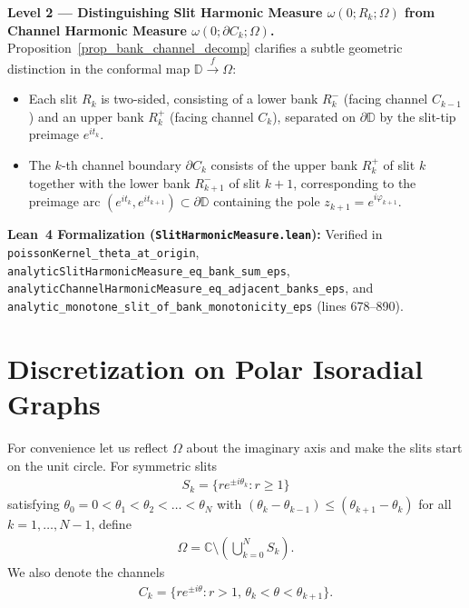 \documentclass[11pt,reqno]{amsart}
\numberwithin{equation}{section}
\renewcommand{\phi}{\varphi}
\newcommand{\D}{\mathbb{D}}
\newcommand{\C}{\mathbb{C}}
\begin{document}
\begin{leveltwo}
\noindent\textbf{\textcolor{l2border}{Level 2 --- Distinguishing Slit Harmonic Measure $\omega(0; R_k; \varOmega)$ from Channel Harmonic Measure $\omega(0; \partial C_k; \varOmega)$.}}
Proposition~\ref{prop_bank_channel_decomp} clarifies a subtle geometric distinction in the conformal map $\D \xrightarrow{f} \varOmega$:
\begin{itemize}
\item Each slit $R_k$ is two-sided, consisting of a lower bank $R_k^-$ (facing channel $C_{k-1}$) and an upper bank $R_k^+$ (facing channel $C_k$), separated on $\partial\D$ by the slit-tip preimage $e^{it_k}$.
\item The $k$-th channel boundary $\partial C_k$ consists of the upper bank $R_k^+$ of slit $k$ together with the lower bank $R_{k+1}^-$ of slit $k+1$, corresponding to the preimage arc $(e^{it_k}, e^{it_{k+1}}) \subset \partial\D$ containing the pole $z_{k+1} = e^{i\phi_{k+1}}$.
\end{itemize}
\noindent\textbf{\textcolor{leannote}{Lean~4 Formalization (\texttt{SlitHarmonicMeasure.lean}):}} Verified in \texttt{poissonKernel\_theta\_at\_origin}, \texttt{analyticSlitHarmonicMeasure\_eq\_bank\_sum\_eps}, \texttt{analyticChannelHarmonicMeasure\_eq\_adjacent\_banks\_eps}, and \texttt{analytic\_monotone\_slit\_of\_bank\_monotonicity\_eps} (lines 678--890).
\end{leveltwo}

\section{Discretization on Polar Isoradial Graphs}

For convenience let us reflect $\varOmega$ about the imaginary axis and make the slits start on the unit circle.
For symmetric slits
\begin{align}
S_k = \{ re^{\pm i \theta_k} :  r \ge 1\}
\end{align}
satisfying $\theta_0 = 0 < \theta_1 < \theta_2 < \dots < \theta_N$ with $(\theta_k - \theta_{k-1}) \leq (\theta_{k+1} - \theta_k)$ for all $k = 1, \dots, N-1$, define
\begin{align}
\varOmega = \C \setminus \left( \bigcup_{k=0}^N S_k \right).
\end{align}
We also denote the channels
\begin{align}
C_k = \{ re^{\pm i \theta} :  r > 1,\, \theta_k < \theta < \theta_{k+1}\}.
\end{align}
\end{document}
